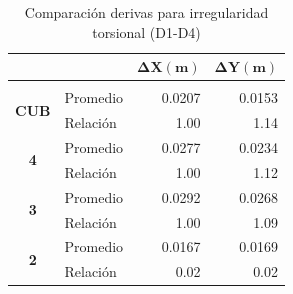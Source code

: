\documentclass[12pt]{article}
\begin{document}
\begin{table}[H]
  \centering
    \begin{tabular}{|c|l|r|r|}
\cline{3-4}    \multicolumn{1}{r}{} &     & \multicolumn{1}{c|}{\cellcolor[rgb]{ .2,  .247,  .31}\textcolor[rgb]{ 1,  1,  1}{\textbf{$\mathbf{\Delta X (m)}$}}} & \multicolumn{1}{c|}{\cellcolor[rgb]{ .2,  .247,  .31}\textcolor[rgb]{ 1,  1,  1}{\textbf{$\mathbf{\Delta Y (m)}$}}} \bigstrut\\
    \hline
    \rowcolor[rgb]{ .2,  .247,  .31} \multicolumn{4}{|c|}{\textcolor[rgb]{ 1,  1,  1}{\textbf{D1-D4}}} \bigstrut\\
    \hline
    \multirow{2}[4]{*}{\textbf{CUB}} & Promedio & 0.0207 & 0.0153 \bigstrut\\
\cline{2-4}        & Relación & 1.00 & 1.14 \bigstrut\\
    \hline
    \multirow{2}[4]{*}{\textbf{4}} & Promedio & 0.0277 & 0.0234 \bigstrut\\
\cline{2-4}        & Relación & 1.00 & 1.12 \bigstrut\\
    \hline
    \multirow{2}[4]{*}{\textbf{3}} & Promedio & 0.0292 & 0.0268 \bigstrut\\
\cline{2-4}        & Relación & 1.00 & 1.09 \bigstrut\\
    \hline
    \multirow{2}[4]{*}{\textbf{2}} & Promedio & 0.0167 & 0.0169 \bigstrut\\
\cline{2-4}        & Relación & 0.02 & 0.02 \bigstrut\\
    \hline
    \end{tabular}%
    \caption{Comparación derivas para irregularidad torsional (D1-D4)}
  \label{tab:D1-D4}%
\end{table}%
\end{document}
